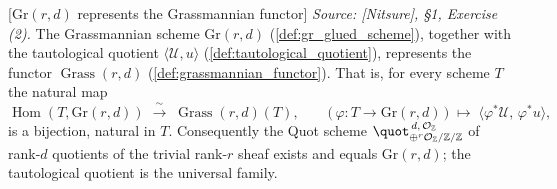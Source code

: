 \begin{theorem}

[\(\mathrm{Gr}(r,d)\) represents the Grassmannian functor]
  \label{thm:grassmannian_universal_property}
  \textit{Source: [Nitsure], \S 1, Exercise (2).}
  The Grassmannian scheme \(\mathrm{Gr}(r,d)\) (\cref{def:gr_glued_scheme}),
  together with the tautological quotient \(\langle \mathcal{U}, u \rangle\)
  (\cref{def:tautological_quotient}), represents the functor
  \(\operatorname{Grass}(r,d)\) (\cref{def:grassmannian_functor}). That is, for
  every scheme \(T\) the natural map
  \[
    \operatorname{Hom}(T, \mathrm{Gr}(r,d))
      \;\xrightarrow{\;\sim\;}\;
    \operatorname{Grass}(r,d)(T),
    \qquad
    \bigl(\,\varphi : T \to \mathrm{Gr}(r,d)\,\bigr)
      \;\longmapsto\;
    \langle \varphi^{*}\mathcal{U},\, \varphi^{*}u \rangle,
  \]
  is a bijection, natural in \(T\). Consequently the Quot scheme
  \(\quot^{\,d,\,\mathcal{O}_{\mathbb{Z}}}_{\oplus^{r}\mathcal{O}_{\mathbb{Z}}/
  \mathbb{Z}/\mathbb{Z}}\) of rank-\(d\) quotients of the trivial rank-\(r\) sheaf
  exists and equals \(\mathrm{Gr}(r,d)\); the tautological quotient is the
  universal family.
\end{theorem}

